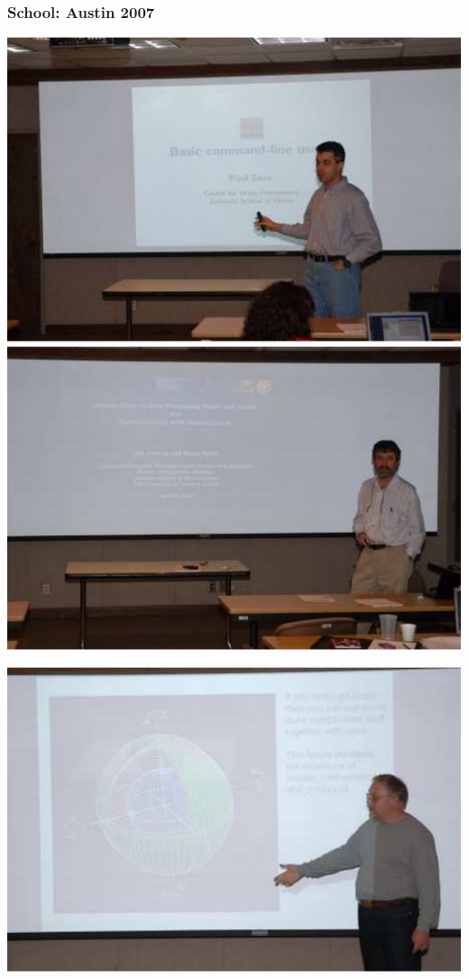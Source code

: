 \begin{frame}
  \frametitle{School: Austin 2007}
  \begin{minipage}{0.45\textwidth} 
  \includegraphics[width=\textwidth]{Fig/Paul}
   \includegraphics[width=\textwidth]{Fig/Jim}
  \end{minipage} \hfill
  \begin{minipage}{0.45\textwidth}
  \includegraphics[width=\textwidth]{Fig/Joe}

\end{minipage}
\end{frame}
